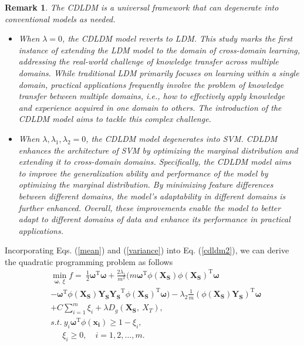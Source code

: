 \documentclass[a4paper]{cas-sc}
\newtheorem{remark}{Remark}
\begin{document}

\begin{remark}
The CDLDM is a universal framework that can  degenerate into conventional models as needed.


\begin{itemize}
\item[$\bullet$] When $\lambda = 0$, the CDLDM model reverts to LDM. This study marks the first instance of extending the LDM model to the domain of cross-domain learning, addressing the real-world challenge of knowledge transfer across multiple domains. While traditional LDM primarily focuses on learning within a single domain, practical applications frequently involve the problem of knowledge transfer between multiple domains, i.e., how to effectively apply knowledge and experience acquired in one domain to others. The introduction of the CDLDM model aims to tackle this complex challenge.

\item[$\bullet$] When $\lambda, \lambda_1, \lambda_2 = 0$, the CDLDM model degenerates into SVM. CDLDM enhances the architecture of SVM by optimizing the marginal distribution and extending it to cross-domain domains.
Specifically, the CDLDM model aims to improve the generalization ability and performance of the model by optimizing the marginal distribution. By minimizing feature differences between different domains, the model's adaptability in different domains is further enhanced.
Overall, these improvements enable the model to better adapt to different domains of data and enhance its performance in practical applications.
\end{itemize}
\end{remark}

Incorporating Eqs. (\ref{mean}) and (\ref{variance}) into Eq. (\ref{cdldm2}), we can derive the quadratic programming problem as follows
\begin{equation}\label{cdldm3}
\begin{aligned}
&\mathop {\min }\limits_{\boldsymbol{\omega},\ \xi } f = \ \frac{1}{2}\boldsymbol{\omega}^{\mathrm{T}}\boldsymbol{\omega} + \frac{2\lambda_1}{m^2}(m\boldsymbol{\omega}^{\mathrm{T}}\phi(\boldsymbol{X_S})\phi(\boldsymbol{X_S})^{\mathrm{T}}\boldsymbol{\omega} \\
&- \boldsymbol{\omega}^{\mathrm{T}}\phi(\boldsymbol{X_S})\boldsymbol{Y_S}\boldsymbol{Y_S}^{\mathrm{T}}\phi(\boldsymbol{X_S})^{\mathrm{T}}\boldsymbol{\omega}) - \lambda_2\frac{1}{m}(\phi(\boldsymbol{X_S})\boldsymbol{Y_S})^{\mathrm{T}}\boldsymbol{\omega}\\
&+ C\sum\limits_{i = 1}^m\xi_i + \lambda D_{g}(\boldsymbol{X_S},\ X_T), \\
& s.t.\ y_{i}\boldsymbol{\omega}^{\mathrm{T}}\phi(\boldsymbol{x_i})\geq 1-\xi_{i},\\
&\ \ \quad \xi_{i} \geq 0,\quad i=1,2, \ldots, m.
\end{aligned}    
\end{equation}
\end{document}
